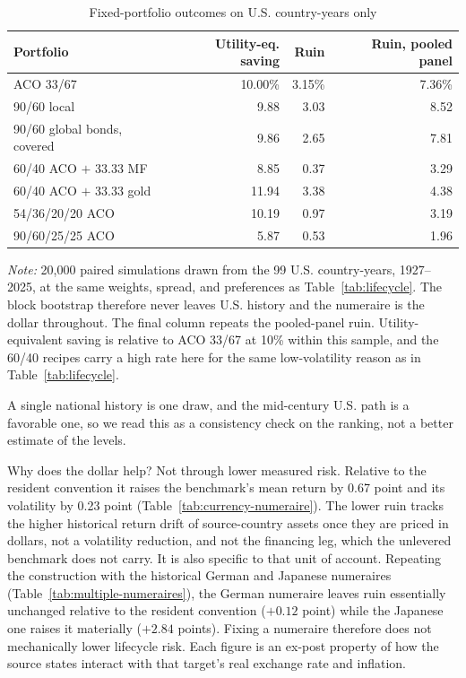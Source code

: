 \documentclass[11pt]{article}
\begin{document}
\begin{table}[H]
\centering
\caption{Fixed-portfolio outcomes on U.S. country-years only}
\label{tab:usa-control}
\setlength{\tabcolsep}{4pt}
\small
\begin{tabular}{lrrr}
\toprule
Portfolio & Utility-eq. saving & Ruin & Ruin, pooled panel \\
\midrule
ACO 33/67 & 10.00\% & 3.15\% & 7.36\% \\
90/60 local & 9.88 & 3.03 & 8.52 \\
90/60 global bonds, covered & 9.86 & 2.65 & 7.81 \\
60/40 ACO $+$ 33.33 MF & 8.85 & 0.37 & 3.29 \\
60/40 ACO $+$ 33.33 gold & 11.94 & 3.38 & 4.38 \\
54/36/20/20 ACO & 10.19 & 0.97 & 3.19 \\
90/60/25/25 ACO & 5.87 & 0.53 & 1.96 \\
\bottomrule
\end{tabular}
\begin{minipage}{0.94\textwidth}\footnotesize
\textit{Note:} 20,000 paired simulations drawn from the 99 U.S. country-years,
1927--2025, at the same weights, spread, and preferences as
Table~\ref{tab:lifecycle}. The block bootstrap therefore never leaves U.S.
history and the numeraire is the dollar throughout. The final column repeats the
pooled-panel ruin. Utility-equivalent saving is relative to ACO 33/67 at 10\%
within this sample, and the 60/40 recipes carry a high rate here for the same
low-volatility reason as in Table~\ref{tab:lifecycle}.
\end{minipage}
\end{table}

A single national history is one draw, and the mid-century U.S. path is a
favorable one, so we read this as a consistency check on the ranking, not a
better estimate of the levels.

Why does the dollar help? Not through lower measured risk. Relative to the
resident convention it raises the benchmark's mean return by 0.67 point and its
volatility by 0.23 point (Table~\ref{tab:currency-numeraire}). The lower ruin
tracks the higher historical return drift of source-country assets once they are
priced in dollars, not a volatility reduction, and not the financing leg, which
the unlevered benchmark does not carry. It is also specific to that unit of
account. Repeating the construction with the historical German and Japanese
numeraires (Table~\ref{tab:multiple-numeraires}), the German numeraire leaves
ruin essentially unchanged relative to the resident convention ($+0.12$ point) while the
Japanese one raises it materially ($+2.84$ points). Fixing a numeraire therefore
does not mechanically lower lifecycle risk. Each figure is an ex-post property of
how the source states interact with that target's real exchange rate and
inflation.
\end{document}
